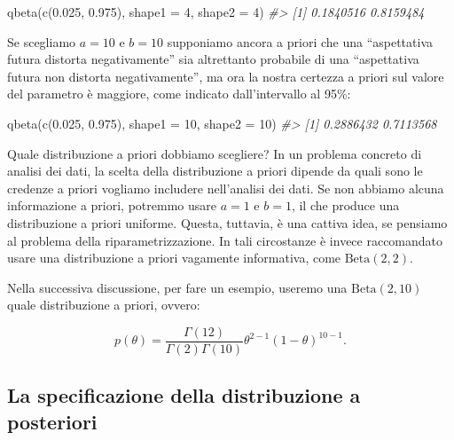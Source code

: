 \documentclass[
]{memoir}
\newenvironment{Shaded}{\begin{snugshade}}{\end{snugshade}}
\newcommand{\AttributeTok}[1]{\textcolor[rgb]{0.77,0.63,0.00}{#1}}
\newcommand{\CommentTok}[1]{\textcolor[rgb]{0.56,0.35,0.01}{\textit{#1}}}
\newcommand{\DecValTok}[1]{\textcolor[rgb]{0.00,0.00,0.81}{#1}}
\newcommand{\FloatTok}[1]{\textcolor[rgb]{0.00,0.00,0.81}{#1}}
\newcommand{\FunctionTok}[1]{\textcolor[rgb]{0.00,0.00,0.00}{#1}}
\newcommand{\NormalTok}[1]{#1}
\theoremstyle{definition}
\theoremstyle{definition}
\theoremstyle{definition}
\theoremstyle{definition}
\theoremstyle{remark}
\begin{document}
\begin{Shaded}
\begin{Highlighting}[]
\FunctionTok{qbeta}\NormalTok{(}\FunctionTok{c}\NormalTok{(}\FloatTok{0.025}\NormalTok{, }\FloatTok{0.975}\NormalTok{), }\AttributeTok{shape1 =} \DecValTok{4}\NormalTok{, }\AttributeTok{shape2 =} \DecValTok{4}\NormalTok{)}
\CommentTok{\#\textgreater{} [1] 0.1840516 0.8159484}
\end{Highlighting}
\end{Shaded}

Se scegliamo \(a=10\) e \(b=10\) supponiamo ancora a priori che una ``aspettativa futura distorta negativamente'' sia altrettanto probabile di una ``aspettativa futura non distorta negativamente'', ma ora la nostra certezza a priori sul valore del parametro è maggiore, come indicato dall'intervallo al 95\%:

\begin{Shaded}
\begin{Highlighting}[]
\FunctionTok{qbeta}\NormalTok{(}\FunctionTok{c}\NormalTok{(}\FloatTok{0.025}\NormalTok{, }\FloatTok{0.975}\NormalTok{), }\AttributeTok{shape1 =} \DecValTok{10}\NormalTok{, }\AttributeTok{shape2 =} \DecValTok{10}\NormalTok{)}
\CommentTok{\#\textgreater{} [1] 0.2886432 0.7113568}
\end{Highlighting}
\end{Shaded}

Quale distribuzione a priori dobbiamo scegliere? In un problema concreto di analisi dei dati, la scelta della distribuzione a priori dipende da quali sono le credenze a priori vogliamo includere nell'analisi dei dati. Se non abbiamo alcuna informazione a priori, potremmo usare \(a=1\) e \(b=1\), il che produce una distribuzione a priori uniforme. Questa, tuttavia, è una cattiva idea, se pensiamo al problema della riparametrizzazione. In tali circostanze è invece raccomandato usare una distribuzione a priori vagamente informativa, come \(\text{Beta}(2, 2)\).

Nella successiva discussione, per fare un esempio, useremo una \(\text{Beta}(2, 10)\) quale distribuzione a priori, ovvero:

\[
p(\theta) = \frac{\Gamma(12)}{\Gamma(2)\Gamma(10)}\theta^{2-1} (1-\theta)^{10-1}.
\]

\hypertarget{la-specificazione-della-distribuzione-a-posteriori}{%
\subsection{La specificazione della distribuzione a posteriori}\label{la-specificazione-della-distribuzione-a-posteriori}}
\end{document}

